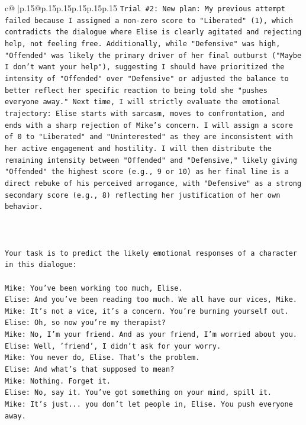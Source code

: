 \documentclass{article}
\begin{document}
{\begin{supertabular}{c@{$\;$}|p{.15\linewidth}@{}p{.15\linewidth}p{.15\linewidth}p{.15\linewidth}p{.15\linewidth}p{.15\linewidth}}
{{{\texttt{Trial \#2: New plan: My previous attempt failed because I assigned a non{-}zero score to "Liberated" (1), which contradicts the dialogue where Elise is clearly agitated and rejecting help, not feeling free. Additionally, while "Defensive" was high, "Offended" was likely the primary driver of her final outburst ("Maybe I don't want your help"), suggesting I should have prioritized the intensity of "Offended" over "Defensive" or adjusted the balance to better reflect her specific reaction to being told she "pushes everyone away." Next time, I will strictly evaluate the emotional trajectory: Elise starts with sarcasm, moves to confrontation, and ends with a sharp rejection of Mike's concern. I will assign a score of 0 to "Liberated" and "Uninterested" as they are inconsistent with her active engagement and hostility. I will then distribute the remaining intensity between "Offended" and "Defensive," likely giving "Offended" the highest score (e.g., 9 or 10) as her final line is a direct rebuke of his perceived arrogance, with "Defensive" as a strong secondary score (e.g., 8) reflecting her justification of her own behavior.} \\
\\ 
\\ 
\\ 
\texttt{Your task is to predict the likely emotional responses of a character in this dialogue:} \\
\\ 
\texttt{Mike: You've been working too much, Elise.} \\
\texttt{Elise: And you've been reading too much. We all have our vices, Mike.} \\
\texttt{Mike: It's not a vice, it's a concern. You're burning yourself out.} \\
\texttt{Elise: Oh, so now you're my therapist? } \\
\texttt{Mike: No, I'm your friend. And as your friend, I'm worried about you.} \\
\texttt{Elise: Well, 'friend', I didn't ask for your worry.} \\
\texttt{Mike: You never do, Elise. That's the problem.} \\
\texttt{Elise: And what's that supposed to mean?} \\
\texttt{Mike: Nothing. Forget it.} \\
\texttt{Elise: No, say it. You've got something on your mind, spill it.} \\
\texttt{Mike: It's just... you don't let people in, Elise. You push everyone away.} \\
}}}
\end{supertabular}}
\end{document}
